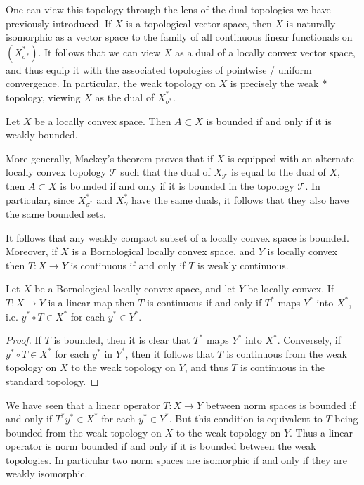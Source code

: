 One can view this topology through the lens of the dual topologies we have previously introduced. If $X$ is a topological vector space, then $X$ is naturally isomorphic as a vector space to the family of all continuous linear functionals on $(X^*_{\sigma^*})$. It follows that we can view $X$ as a dual of a locally convex vector space, and thus equip it with the associated topologies of pointwise / uniform convergence. In particular, the weak topology on $X$ is precisely the weak $*$ topology, viewing $X$ as the dual of $X^*_{\sigma^*}$.

\begin{theorem}
    Let $X$ be a locally convex space. Then $A \subset X$ is bounded if and only if it is weakly bounded.
\end{theorem}

More generally, Mackey's theorem proves that if $X$ is equipped with an alternate locally convex topology $\mathcal{T}$ such that the dual of $X_{\mathcal{T}}$ is equal to the dual of $X$, then $A \subset X$ is bounded if and only if it is bounded in the topology $\mathcal{T}$. In particular, since $X^*_{\sigma^*}$ and $X^*_\gamma$ have the same duals, it follows that they also have the same bounded sets.

It follows that any weakly compact subset of a locally convex space is bounded. Moreover, if $X$ is a Bornological locally convex space, and $Y$ is locally convex then $T: X \to Y$ is continuous if and only if $T$ is weakly continuous.

\begin{corollary}
    Let $X$ be a Bornological locally convex space, and let $Y$ be locally convex. If $T: X \to Y$ is a linear map then $T$ is continuous if and only if $T^*$ maps $Y^*$ into $X^*$, i.e. $y^* \circ T \in X^*$ for each $y^* \in Y^*$.
\end{corollary}
\begin{proof}
    If $T$ is bounded, then it is clear that $T^*$ maps $Y^*$ into $X^*$. Conversely, if $y^* \circ T \in X^*$ for each $y^*$ in $Y^*$, then it follows that $T$ is continuous from the weak topology on $X$ to the weak topology on $Y$, and thus $T$ is continuous in the standard topology.
\end{proof}

We have seen that a linear operator $T: X \to Y$ between norm spaces is bounded if and only if $T^* y^* \in X^*$ for each $y^* \in Y^*$. But this condition is equivalent to $T$ being bounded from the weak topology on $X$ to the weak topology on $Y$. Thus a linear operator is norm bounded if and only if it is bounded between the weak topologies. In particular two norm spaces are isomorphic if and only if they are weakly isomorphic.

